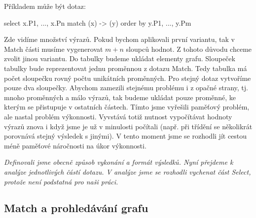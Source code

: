 Příkladem může být dotaz: 
\begin{code}
select x.P1, ..., x.Pn match (x) -> (y) order by y.P1, ..., y.Pm 
\end{code}

Zde vidíme množství výrazů.
Pokud bychom aplikovali první variantu, tak v Match části musíme vygenerovat $m + n$ sloupců hodnot.
Z tohoto důvodu chceme zvolit jinou variantu.
Do tabulky budeme ukládat elementy grafu.
Sloupeček tabulky bude reprezentovat jednu proměnnou z dotazu Match.
Tedy tabulka má počet sloupečku rovný počtu unikátních proměnných. 
Pro stejný dotaz vytvoříme pouze dva sloupečky.
Abychom zamezili stejnému problému i z opačné strany, tj. mnoho proměnných a málo výrazů, tak budeme ukládat pouze proměnné, ke kterým se přistupuje v ostatních částech.
Tímto jsme vyřešili paměťový problém, ale nastal problém výkonnosti.
Vyvstává totiž nutnost vypočítávat hodnoty výrazů znova i když jsme je už v minulosti počítali (např. při třídění se několikrát porovnává stejný výsledek s jinými).
V tento moment jsme se rozhodli jít cestou méně paměťové náročnosti na úkor výkonnosti.

\bigskip
\textit{Definovali jsme obecně způsob vykonání a formát výsledků. Nyní přejdeme k analýze jednotlivých částí dotazu. V analýze jsme se rozhodli vychenat část Select, protože není podstatná pro naši práci.}

\subsection{Match a prohledávání grafu}

